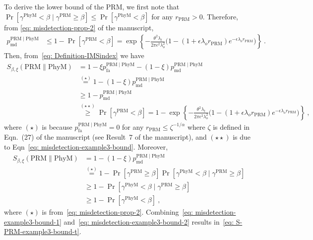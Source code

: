\documentclass[12pt, draftclsnofoot, onecolumn]{IEEEtran}
\begin{document}
\begin{IEEEproof}
To derive the lower bound of the PRM, we first note that $\Pr \left[\gamma^{\mathrm{PhyM}} < \beta \mid \gamma^{\mathrm{PRM}} \geq \beta \right] \leq \Pr \left[\gamma^{\mathrm{PhyM}} < \beta \right]$ for any ${r_{\mathrm{PRM}} > 0}$. Therefore, from \eqref{eq: misdetection-prop-2} of the manuscript,
\begin{align}\label{eq: misdetection-example3-bound}
p_{\mathrm{md}}^{{\mathrm{PRM}} \mid {\mathrm{PhyM}}} & \leq 1 - \Pr \left[\gamma^{\mathrm{PRM}} < \beta \right] =  \exp\left\{- \frac{\theta^2 \lambda_t}{2\pi \epsilon^{2} \lambda_{o}^{2}} \Big( 1 - \left( 1 + \epsilon \lambda_o r_{\mathrm{PRM}} \right)e^{- \epsilon \lambda_o r_{\mathrm{PRM}}}\Big) \right\}\:.
\end{align}
Then, from~\eqref{eq: Definition-IMSindex} we have
\begin{align}\label{eq: misdetection-example3-bound-1}
S_{\beta,\xi}\left(\mathrm{PRM}\|\mathrm{PhyM} \right) &  = 1 - \xi p_{\mathrm{fa}}^{{\mathrm{PRM}} \mid {\mathrm{PhyM}}} - \left( 1 - \xi\right) p_{\mathrm{md}}^{{\mathrm{PRM}} \mid {\mathrm{PhyM}}} \nonumber \\
& \stackrel{(\star)}{=} 1 - \left( 1 - \xi\right) p_{\mathrm{md}}^{{\mathrm{PRM}} \mid {\mathrm{PhyM}}} \nonumber\\
& \geq 1 - p_{\mathrm{md}}^{{\mathrm{PRM}} \mid {\mathrm{PhyM}}} \nonumber \\
& \stackrel{(\star\star)}{\geq} \Pr \left[\gamma^{\mathrm{PRM}}  < \beta \right] = 1 - \exp\left\{- \frac{\theta^2 \lambda_t}{2\pi \epsilon^{2} \lambda_{o}^{2}} \Big( 1 - \left( 1 + \epsilon \lambda_o r_{\mathrm{PRM}} \right)e^{- \epsilon \lambda_o r_{\mathrm{PRM}}}\Big) \right\} \:,
\end{align}
where $(\star)$ is because $p_{\mathrm{fa}}^{{\mathrm{PRM}} \mid {\mathrm{PhyM}}} = 0$ for any $r_{\mathrm{PRM}} \leq \zeta^{-1/\alpha}$ where $\zeta$ is defined in Eqn.~(27) of the manuscript (see Result~7 of the manuscript), and $(\star\star)$ is due to Eqn~\eqref{eq: misdetection-example3-bound}. Moreover,
\begin{align}\label{eq: misdetection-example3-bound-2}
S_{\beta,\xi}\left(\mathrm{PRM}\|\mathrm{PhyM} \right) & = 1 - \left( 1 - \xi\right) p_{\mathrm{md}}^{{\mathrm{PRM}} \mid {\mathrm{PhyM}}} \nonumber\\
& \stackrel{(\star)}{=} 1 - \Pr \left[\gamma^{\mathrm{PRM}} \geq \beta \right] \Pr \left[\gamma^{\mathrm{PhyM}} < \beta \mid \gamma^{\mathrm{PRM}} \geq \beta \right] \nonumber \\
& \geq 1 - \Pr \left[\gamma^{\mathrm{PhyM}} < \beta \mid \gamma^{\mathrm{PRM}} \geq \beta \right] \nonumber \\
& \geq 1 - \Pr \left[\gamma^{\mathrm{PhyM}} < \beta \right] \:,
\end{align}
where $(\star)$ is from~\eqref{eq: misdetection-prop-2}. Combining~\eqref{eq: misdetection-example3-bound-1} and~\eqref{eq: misdetection-example3-bound-2} results in~\eqref{eq: S-PRM-example3-bound-t}.
\end{IEEEproof}



\end{document}
